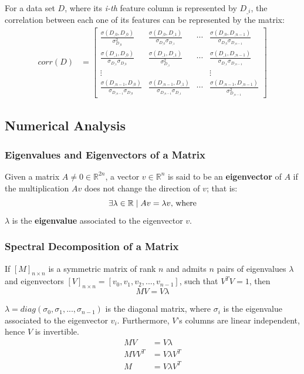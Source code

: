 \documentclass[12pt]{article}
\begin{document}
For a data set $D$, where its {\em i-th} feature column is represented by $D_{\_i}$, the correlation between each one of its features can be represented by the matrix:
\begin{align*}
	corr(D) &= \begin{bmatrix}
		\frac{\sigma(D_{\_0}, D_{\_0})}{\sigma_{D_{\_0}}^2} & \frac{\sigma(D_{\_0}, D_{\_1})}{\sigma_{D_{\_0}} \sigma_{D_{\_1}}} & \cdots & \frac{\sigma(D_{\_0}, D_{\_n-1})}{\sigma_{D_{\_0}} \sigma_{D_{\_n-1}}} \\
		\frac{\sigma(D_{\_1}, D_{\_0})}{\sigma_{D_{\_1}} \sigma_{D_{\_0}}} & \frac{\sigma(D_{\_1}, D_{\_1})}{\sigma_{D_{\_1}}^2} & \cdots & \frac{\sigma(D_{\_1}, D_{\_n-1})}{\sigma_{D_{\_1}} \sigma_{D_{\_n-1}}} \\
		\vdots &&& \vdots \\
		\frac{\sigma(D_{\_n-1}, D_{\_0})}{\sigma_{D_{\_n-1}} \sigma_{D_{\_0}}} & \frac{\sigma(D_{\_n-1}, D_{\_1})}{\sigma_{D_{\_n-1}} \sigma_{D_{\_1}}} & \cdots & \frac{\sigma(D_{\_n-1}, D_{\_n-1})}{\sigma_{D_{\_n-1}}^2}
	\end{bmatrix}
\end{align*}

\subsection{Numerical Analysis}
\subsubsection{Eigenvalues and Eigenvectors of a Matrix}

Given a matrix $A \ne 0 \in \mathbb{R}^{2n}$, a vector $v \in \mathbb{R}^n$ is said to be an \textbf{eigenvector} of $A$ if the multiplication $Av$ does not change the direction of $v$; that is:
$$\exists \lambda \in \mathbb{R} \mid Av = \lambda v \textnormal{, where}$$
$\lambda$ is the \textbf{eigenvalue} associated to the eigenvector $v$.

\subsubsection{Spectral Decomposition of a Matrix \cite{cox2001}}

If $[M]_{n\times n}$ is a symmetric matrix of rank $n$ and admits $n$ pairs of eigenvalues $\lambda$ and eigenvectors $[V]_{n\times n} = [v_0, v_1, v_2, ..., v_{n-1}]$, such that $V^TV = 1$, then
$$MV = V \lambda$$

$\lambda = diag(\sigma_0, \sigma_1, ..., \sigma_{n-1})$ is the diagonal matrix, where $\sigma_i$ is the eigenvalue associated to the eigenvector $v_i$. Furthermore, $V$'s columns are linear independent, hence $V$ is invertible.
\begin{align*}
	MV &= V \lambda \\
	MVV^T &= V \lambda V^T \\
	M &= V \lambda V^T
\end{align*}
\end{document}
